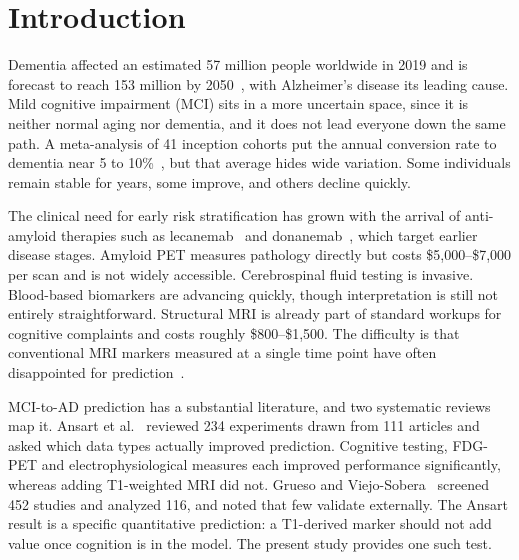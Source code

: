 \documentclass[blue]{ludusofficial}  %
\begin{document}
\maketitle

\section{Introduction}

Dementia affected an estimated 57 million people worldwide in 2019 and is forecast to reach 153 million by 2050~\cite{gbd2022dementia}, with Alzheimer's disease its leading cause. Mild cognitive impairment (MCI) sits in a more uncertain space, since it is neither normal aging nor dementia, and it does not lead everyone down the same path. A meta-analysis of 41 inception cohorts put the annual conversion rate to dementia near 5 to 10\%~\cite{mitchell2009rate}, but that average hides wide variation. Some individuals remain stable for years, some improve, and others decline quickly.

The clinical need for early risk stratification has grown with the arrival of anti-amyloid therapies such as lecanemab~\cite{vanDyck2022lecanemab} and donanemab~\cite{sims2023donanemab}, which target earlier disease stages. Amyloid PET measures pathology directly but costs \$5,000--\$7,000 per scan and is not widely accessible. Cerebrospinal fluid testing is invasive. Blood-based biomarkers are advancing quickly, though interpretation is still not entirely straightforward. Structural MRI is already part of standard workups for cognitive complaints and costs roughly \$800--\$1,500. The difficulty is that conventional MRI markers measured at a single time point have often disappointed for prediction~\cite{ansart2021predicting}.

MCI-to-AD prediction has a substantial literature, and two systematic reviews map it. Ansart et al.~\cite{ansart2021predicting} reviewed 234 experiments drawn from 111 articles and asked which data types actually improved prediction. Cognitive testing, FDG-PET and electrophysiological measures each improved performance significantly, whereas adding T1-weighted MRI did not. Grueso and Viejo-Sobera~\cite{grueso2021machine} screened 452 studies and analyzed 116, and noted that few validate externally. The Ansart result is a specific quantitative prediction: a T1-derived marker should not add value once cognition is in the model. The present study provides one such test.
\end{document}
